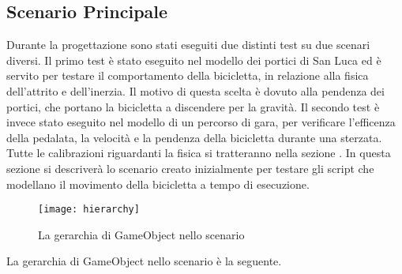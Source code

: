 \subsection{Scenario Principale}
Durante la progettazione sono stati eseguiti due distinti test su due scenari diversi. Il primo test è stato eseguito nel modello dei portici di San Luca ed è servito per testare il comportamento della bicicletta, in relazione alla fisica dell'attrito e dell'inerzia. Il motivo di questa scelta è dovuto alla pendenza dei portici, che portano la bicicletta a discendere per la gravità. Il secondo test è invece stato eseguito nel modello di un percorso di gara, per verificare l'efficenza della pedalata, la velocità e la pendenza della bicicletta durante una sterzata. Tutte le calibrazioni riguardanti la fisica si tratteranno nella sezione \textit{}. In questa sezione si descriverà lo scenario creato inizialmente per testare gli script che modellano il movimento della bicicletta a tempo di esecuzione.\\
 \begin{figure}[htb]
    \centering
    \texttt{[image: hierarchy]}
    \caption{La gerarchia di GameObject nello scenario\label{fig:hierarchy}}
\end{figure}
\noindent La gerarchia di GameObject nello scenario è la seguente.
